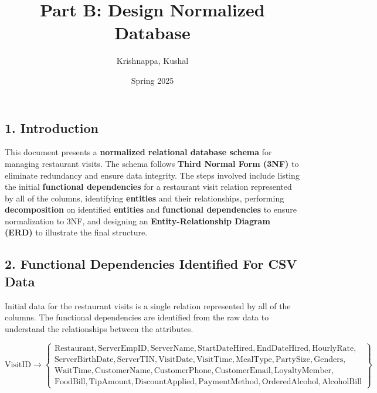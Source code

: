 \documentclass[
]{article}
\title{Part B: Design Normalized Database}
\author{Krishnappa, Kushal}
\date{Spring 2025}
\begin{document}
\maketitle

\subsection{\texorpdfstring{\textbf{1.
Introduction}}{1. Introduction}}\label{introduction}

This document presents a \textbf{normalized relational database schema}
for managing restaurant visits. The schema follows \textbf{Third Normal
Form (3NF)} to eliminate redundancy and ensure data integrity. The steps
involved include listing the initial \textbf{functional dependencies}
for a restaurant visit relation represented by all of the columns,
identifying \textbf{entities} and their relationships, performing
\textbf{decomposition} on identified \textbf{entities} and
\textbf{functional dependencies} to ensure normalization to 3NF, and
designing an \textbf{Entity-Relationship Diagram (ERD)} to illustrate
the final structure.

\subsection{\texorpdfstring{\textbf{2. Functional Dependencies
Identified For CSV
Data}}{2. Functional Dependencies Identified For CSV Data}}\label{functional-dependencies-identified-for-csv-data}

Initial data for the restaurant visits is a single relation represented
by all of the columns. The functional dependencies are identified from
the raw data to understand the relationships between the attributes.

\[
\text{VisitID} \rightarrow 
\left\{
\begin{array}{l}
\text{Restaurant}, \text{ServerEmpID}, \text{ServerName}, \text{StartDateHired}, \text{EndDateHired}, \text{HourlyRate}, \\
\text{ServerBirthDate}, \text{ServerTIN}, \text{VisitDate}, \text{VisitTime}, \text{MealType}, \text{PartySize}, \text{Genders}, \\
\text{WaitTime}, \text{CustomerName}, \text{CustomerPhone}, \text{CustomerEmail}, \text{LoyaltyMember}, \\
\text{FoodBill}, \text{TipAmount}, \text{DiscountApplied}, \text{PaymentMethod}, \text{OrderedAlcohol}, \text{AlcoholBill} 
\end{array}
\right\}
\]
\end{document}
